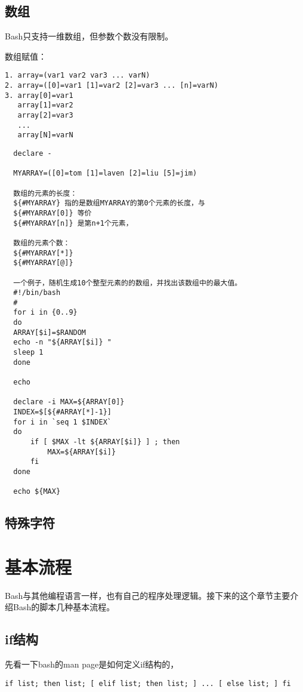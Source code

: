 \subsection{数组}

Bash只支持一维数组，但参数个数没有限制。

数组赋值：

\begin{verbatim}
1. array=(var1 var2 var3 ... varN)
2. array=([0]=var1 [1]=var2 [2]=var3 ... [n]=varN)
3. array[0]=var1
   array[1]=var2
   array[2]=var3
   ...
   array[N]=varN
\end{verbatim}

\begin{verbatim}
  declare -

  MYARRAY=([0]=tom [1]=laven [2]=liu [5]=jim)
  
  数组的元素的长度：
  ${#MYARRAY} 指的是数组MYARRAY的第0个元素的长度，与
  ${#MYARRAY[0]} 等价
  ${#MYARRAY[n]} 是第n+1个元素，

  数组的元素个数：
  ${#MYARRAY[*]}
  ${#MYARRAY[@]}

  一个例子，随机生成10个整型元素的的数组，并找出该数组中的最大值。
  #!/bin/bash
  #
  for i in {0..9}
  do
  ARRAY[$i]=$RANDOM
  echo -n "${ARRAY[$i]} "
  sleep 1
  done

  echo

  declare -i MAX=${ARRAY[0]}
  INDEX=$[${#ARRAY[*]-1}]
  for i in `seq 1 $INDEX`
  do
      if [ $MAX -lt ${ARRAY[$i]} ] ; then
          MAX=${ARRAY[$i]}
      fi
  done

  echo ${MAX}
\end{verbatim}

\subsection{特殊字符}

\section{基本流程}

Bash与其他编程语言一样，也有自己的程序处理逻辑。接下来的这个章节主要介
绍Bash的脚本几种基本流程。

\subsection{if结构}

先看一下bash的man page是如何定义if结构的，

\begin{verbatim}
if list; then list; [ elif list; then list; ] ... [ else list; ] fi
\end{verbatim}


